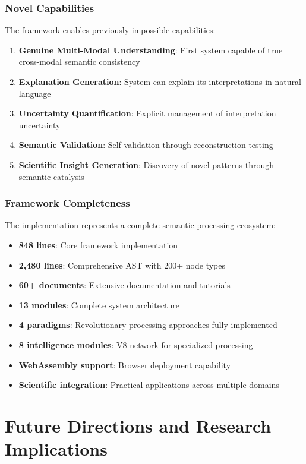 \documentclass[12pt,a4paper,twoside]{article}
\begin{document}
\begin{itemize}
\subsubsection{Novel Capabilities}

The framework enables previously impossible capabilities:

\begin{enumerate}
\item \textbf{Genuine Multi-Modal Understanding}: First system capable of true cross-modal semantic consistency
\item \textbf{Explanation Generation}: System can explain its interpretations in natural language
\item \textbf{Uncertainty Quantification}: Explicit management of interpretation uncertainty
\item \textbf{Semantic Validation}: Self-validation through reconstruction testing
\item \textbf{Scientific Insight Generation}: Discovery of novel patterns through semantic catalysis
\end{enumerate}

\subsubsection{Framework Completeness}

The implementation represents a complete semantic processing ecosystem:

\begin{itemize}
\item \textbf{848 lines}: Core framework implementation
\item \textbf{2,480 lines}: Comprehensive AST with 200+ node types
\item \textbf{60+ documents}: Extensive documentation and tutorials
\item \textbf{13 modules}: Complete system architecture
\item \textbf{4 paradigms}: Revolutionary processing approaches fully implemented
\item \textbf{8 intelligence modules}: V8 network for specialized processing
\item \textbf{WebAssembly support}: Browser deployment capability
\item \textbf{Scientific integration}: Practical applications across multiple domains
\end{itemize}

\section{Future Directions and Research Implications}


\end{itemize}
\end{document}
